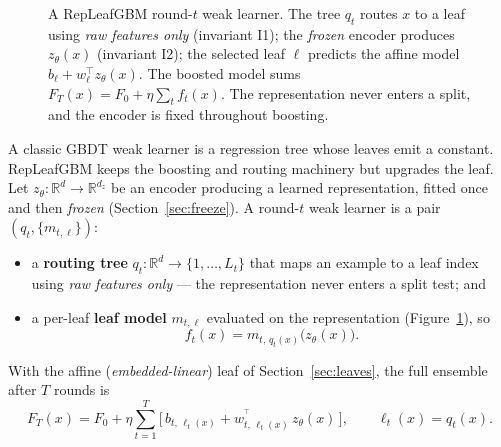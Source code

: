 \documentclass[11pt]{article}
\newcommand{\R}{\mathbb{R}}
\newcommand{\zt}{z_{\theta}}
\newcommand{\trans}{^{\top}}
\begin{document}
\begin{figure}[t]
\centering
{}
\caption{A RepLeafGBM round-$t$ weak learner. The tree $q_t$ routes $x$ to a leaf using
\emph{raw features only} (invariant I1); the \emph{frozen} encoder produces $\zt(x)$
(invariant I2); the selected leaf $\ell$ predicts the affine model $b_\ell + w_\ell^{\top}
\zt(x)$. The boosted model sums $F_T(x) = F_0 + \eta\sum_{t} f_t(x)$. The representation
never enters a split, and the encoder is fixed throughout boosting.}
\label{fig:arch}
\end{figure}

A classic GBDT weak learner is a regression tree whose leaves emit a constant.
RepLeafGBM keeps the boosting and routing machinery but upgrades the leaf. Let
$\zt : \R^{d} \to \R^{d_z}$ be an encoder producing a learned representation, fitted
once and then \emph{frozen} (Section~\ref{sec:freeze}). A round-$t$ weak learner is a
pair $(q_t, \{m_{t,\ell}\})$:
\begin{itemize}
\item a \textbf{routing tree} $q_t : \R^{d} \to \{1,\dots,L_t\}$ that maps an example
  to a leaf index using \emph{raw features only} --- the representation never enters a
  split test; and
\item a per-leaf \textbf{leaf model} $m_{t,\ell}$ evaluated on the representation
(Figure~\ref{fig:arch}), so
\begin{equation}
f_t(x) = m_{t,\,q_t(x)}\big(\zt(x)\big).
\end{equation}
\end{itemize}
With the affine (\emph{embedded-linear}) leaf of Section~\ref{sec:leaves}, the full
ensemble after $T$ rounds is
\begin{equation}
F_T(x) = F_0 + \eta \sum_{t=1}^{T}
\Big[\, b_{t,\,\ell_t(x)} + w_{t,\,\ell_t(x)}^{\!\trans}\, \zt(x) \,\Big],
\qquad \ell_t(x) = q_t(x).
\label{eq:ensemble}
\end{equation}
\end{document}
